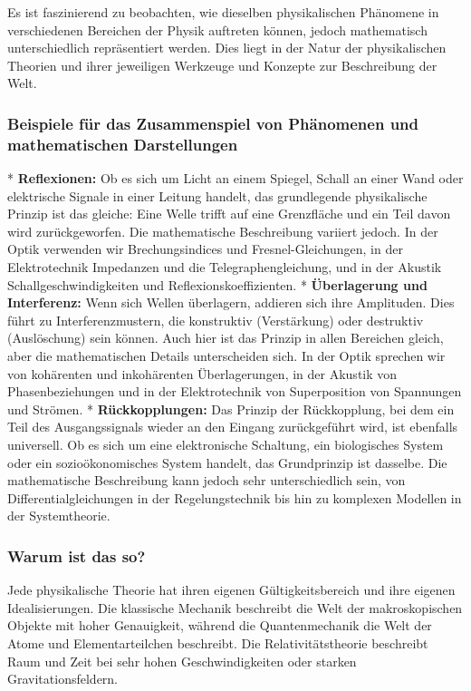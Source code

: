 \documentclass{article}
\begin{document}
Es ist faszinierend zu beobachten, wie dieselben physikalischen Phänomene in verschiedenen Bereichen der Physik auftreten können, jedoch mathematisch unterschiedlich repräsentiert werden. Dies liegt in der Natur der physikalischen Theorien und ihrer jeweiligen Werkzeuge und Konzepte zur Beschreibung der Welt.

\subsubsection{Beispiele für das Zusammenspiel von Phänomenen und mathematischen Darstellungen}

*   \textbf{Reflexionen:} Ob es sich um Licht an einem Spiegel, Schall an einer Wand oder elektrische Signale in einer Leitung handelt, das grundlegende physikalische Prinzip ist das gleiche: Eine Welle trifft auf eine Grenzfläche und ein Teil davon wird zurückgeworfen. Die mathematische Beschreibung variiert jedoch. In der Optik verwenden wir Brechungsindices und Fresnel-Gleichungen, in der Elektrotechnik Impedanzen und die Telegraphengleichung, und in der Akustik Schallgeschwindigkeiten und Reflexionskoeffizienten.
*   \textbf{Überlagerung und Interferenz:} Wenn sich Wellen überlagern, addieren sich ihre Amplituden. Dies führt zu Interferenzmustern, die konstruktiv (Verstärkung) oder destruktiv (Auslöschung) sein können. Auch hier ist das Prinzip in allen Bereichen gleich, aber die mathematischen Details unterscheiden sich. In der Optik sprechen wir von kohärenten und inkohärenten Überlagerungen, in der Akustik von Phasenbeziehungen und in der Elektrotechnik von Superposition von Spannungen und Strömen.
*   \textbf{Rückkopplungen:} Das Prinzip der Rückkopplung, bei dem ein Teil des Ausgangssignals wieder an den Eingang zurückgeführt wird, ist ebenfalls universell. Ob es sich um eine elektronische Schaltung, ein biologisches System oder ein sozioökonomisches System handelt, das Grundprinzip ist dasselbe. Die mathematische Beschreibung kann jedoch sehr unterschiedlich sein, von Differentialgleichungen in der Regelungstechnik bis hin zu komplexen Modellen in der Systemtheorie.

\subsubsection{Warum ist das so?}

Jede physikalische Theorie hat ihren eigenen Gültigkeitsbereich und ihre eigenen Idealisierungen. Die klassische Mechanik beschreibt die Welt der makroskopischen Objekte mit hoher Genauigkeit, während die Quantenmechanik die Welt der Atome und Elementarteilchen beschreibt. Die Relativitätstheorie beschreibt Raum und Zeit bei sehr hohen Geschwindigkeiten oder starken Gravitationsfeldern.
\end{document}
